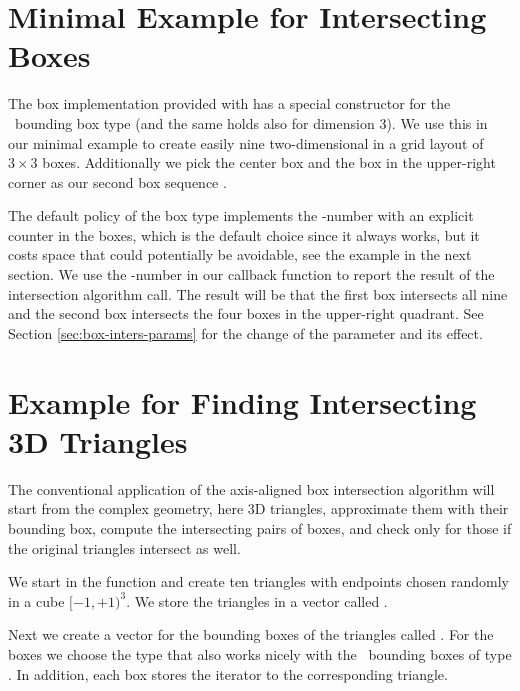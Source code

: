 \section{Minimal Example for Intersecting Boxes}
\label{sec:box-intersect-minimal}

The box implementation provided with
 has a special
constructor for the \cgal\ bounding box type  (and
the same holds also for dimension 3). We use this in our minimal
example to create easily nine two-dimensional  in a grid layout
of $3 \times 3$ boxes. Additionally we pick the center box and the box
in the upper-right corner as our second box sequence . 

The default policy of the box type implements the -number with
an explicit counter in the boxes, which is the default choice since it
always works, but it costs space that could potentially be avoidable,
see the example in the next section. We use the -number in our
callback function to report the result of the intersection algorithm
call. The result will be that the first  box intersects all
nine  and the second  box intersects the four
boxes in the upper-right quadrant. See Section
\ref{sec:box-inters-params} for the change of the 
parameter and its effect.



\section{Example for Finding Intersecting 3D Triangles}

The conventional application of the axis-aligned box intersection
algorithm will start from the complex geometry, here 3D triangles,
approximate them with their bounding box, compute the intersecting
pairs of boxes, and check only for those if the original triangles
intersect as well.

We start in the  function and create ten triangles with
endpoints chosen randomly in a cube $[-1,+1)^3$. We store the
triangles in a vector called .

Next we create a vector for the bounding boxes of the triangles called
. For the boxes we choose the type
 that also works nicely with
the \cgal\ bounding boxes of type . In addition, each
box stores the iterator to the corresponding triangle. 

